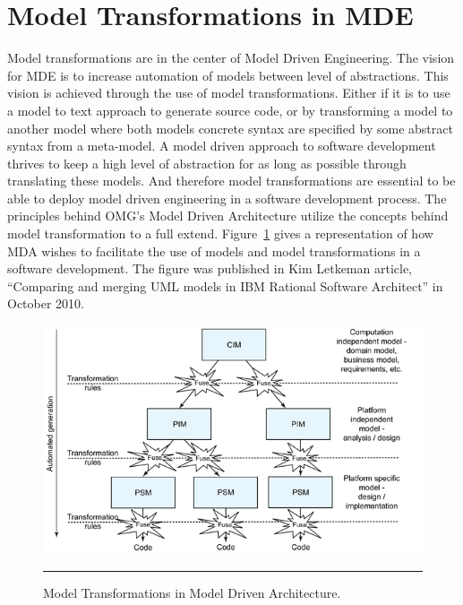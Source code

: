\section{Model Transformations in MDE}

Model transformations are in the center of Model Driven Engineering.
The vision for MDE is to increase automation of models between level of
abstractions. This vision is achieved through the use of model transformations.
Either if it is to use a model to text approach to generate source code, or by
transforming a model to another model where both models concrete syntax are
specified by some abstract syntax from a meta-model. A model driven
approach to software development thrives to keep a high level of abstraction
for as long as possible through translating these models. And therefore model
transformations are essential to be able to deploy model driven engineering in
a software development process. The principles behind OMG's Model Driven
Architecture utilize the concepts behind model transformation to a full extend.
Figure~\ref{fig:MDE_MDA_MT} gives a representation of how MDA wishes to
facilitate the use of models and model transformations in a software
development. The figure was published in Kim Letkeman article, ``Comparing and
merging UML models in IBM Rational Software
Architect''\cite{letkeman2005comparing} in October 2010.

\begin{figure}[H]
  \centering
    \includegraphics[scale=0.8]{./Figures/MDA_MDE.png}
    \rule{35em}{0.5pt}
  \caption[Model Transformations in MDA]
  				{Model Transformations in Model Driven Architecture.}
  \label{fig:MDE_MDA_MT}
\end{figure}

